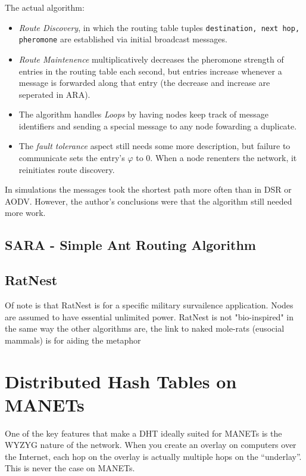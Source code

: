 \documentclass[a4paper]{article}
\begin{document}
The actual algorithm:
\begin{itemize}
    \item \textit{Route Discovery}, in which the routing table tuples \texttt{destination, next hop, pheromone} are established via initial broadcast messages.
    \item \textit{Route Maintenence} multiplicatively decreases the pheromone strength of entries in the routing table each second, but entries increase whenever a message is forwarded along that entry (the decrease and increase are seperated in ARA).
    \item The algorithm handles \textit{Loops} by having nodes keep track of message identifiers and sending a special message to any node fowarding a duplicate. 
    \item  The \textit{fault tolerance} aspect still needs some more description, but failure to communicate sets the entry's  $\varphi$ to 0.  When a node renenters the network, it reinitiates route discovery.
\end{itemize}


In simulations the messages took the shortest path more often than in DSR or AODV.  However, the author's conclusions were that the algorithm still needed more work.


\section{SARA - Simple Ant Routing Algorithm}

\section{RatNest}

Of note is that RatNest is for a specific military survailence application.  Nodes are assumed to have essential unlimited power.
RatNest is not "bio-inspired" in the same way the other algorithms are, the link to naked mole-rats (eusocial mammals) is for aiding the metaphor

\chapter{Distributed Hash Tables on MANETs}
One of the key features that make a DHT ideally suited for MANETs is the WYZYG nature of the network.  When you create an overlay on computers over the Internet, each hop on the overlay is actually multiple hops on the ``underlay''.  This is never the case on MANETs.




\end{document}
